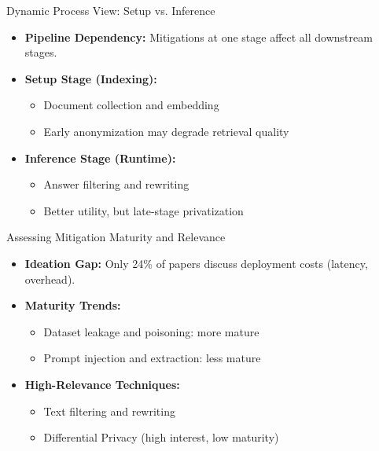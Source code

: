 \documentclass[aspectratio=169,xcolor=dvipsnames]{beamer}
\begin{document}
	\begin{frame}{Dynamic Process View: Setup vs. Inference}
		
		\begin{itemize}
			\item \textbf{Pipeline Dependency:} Mitigations at one stage affect all downstream stages.
			
			\item \textbf{Setup Stage (Indexing):}
			\begin{itemize}
				\item Document collection and embedding
				\item Early anonymization may degrade retrieval quality
			\end{itemize}
			
			\item \textbf{Inference Stage (Runtime):}
			\begin{itemize}
				\item Answer filtering and rewriting
				\item Better utility, but late-stage privatization
			\end{itemize}
		\end{itemize}
		
	\end{frame}
	
	\begin{frame}{Assessing Mitigation Maturity and Relevance}
		
		\begin{itemize}
			\item \textbf{Ideation Gap:} Only 24\% of papers discuss deployment costs (latency, overhead).
			
			\item \textbf{Maturity Trends:}
			\begin{itemize}
				\item Dataset leakage and poisoning: more mature
				\item Prompt injection and extraction: less mature
			\end{itemize}
			
			\item \textbf{High-Relevance Techniques:}
			\begin{itemize}
				\item Text filtering and rewriting
				\item Differential Privacy (high interest, low maturity)
			\end{itemize}
		\end{itemize}
		
	\end{frame}
	
\end{document}
